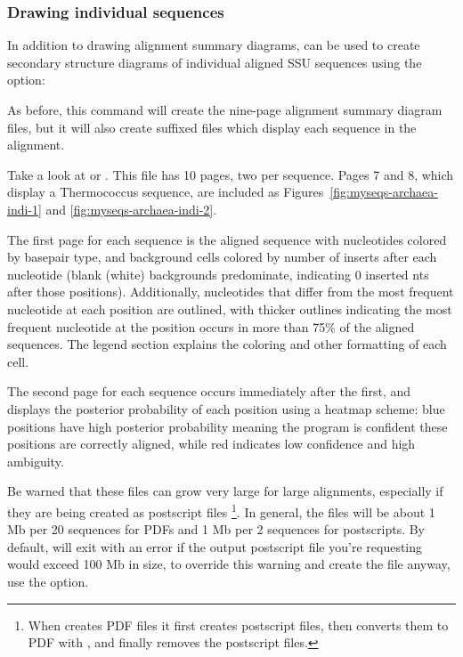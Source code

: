 \subsubsection{Drawing individual sequences}

In addition to drawing alignment summary diagrams,  can
be used to create secondary structure diagrams of individual aligned
SSU sequences using the  option:


As before, this command will create the nine-page alignment summary
diagram files, but it will also create  suffixed
files which display each sequence in the alignment. 

Take a look at  or
. This file has 10 pages, two per
sequence. Pages 7 and 8, which display a Thermococcus sequence, are
included as Figures~\ref{fig:myseqs-archaea-indi-1} and
\ref{fig:myseqs-archaea-indi-2}.

The first page for each sequence is the aligned sequence with
nucleotides colored by basepair type, and background cells colored by
number of inserts after each nucleotide (blank (white) backgrounds
predominate, indicating 0 inserted nts after those
positions). Additionally, nucleotides that differ from the most
frequent nucleotide at each position are outlined, with thicker
outlines indicating the most frequent nucleotide at the position
occurs in more than 75\% of the aligned sequences. The legend section
explains the coloring and other formatting of each cell.

The second page for each sequence occurs immediately after
the first, and displays the posterior probability of each position
using a heatmap scheme: blue positions have high posterior
probability meaning the program is confident these positions are
correctly aligned, while red indicates low confidence and high
ambiguity. 

Be warned that these files can grow very large for large alignments,
especially if they are being created as postscript
files \footnote{When  creates PDF files it first
  creates postscript files, then converts them to PDF with
  , and finally removes the postscript files.}. In
general, the files will be about 1 Mb per 20 sequences for PDFs and 1
Mb per 2 sequences for postscripts. By default,  will
exit with an error if the output postscript file you're requesting
would exceed 100 Mb in size, to override this warning and create the
file anyway, use the  option.

